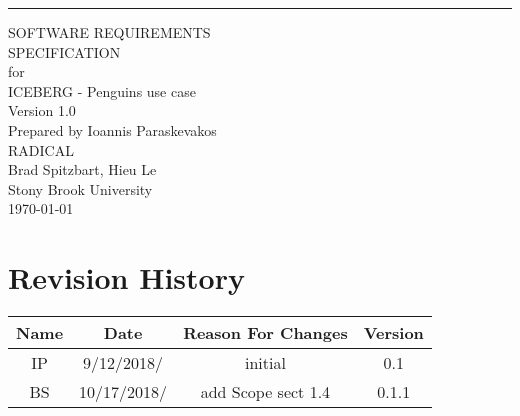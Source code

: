 \documentclass{scrreprt}
\date{}
\title{}
\def\myversion{1.0 }
\begin{document}
\begin{flushright}
    \rule{16cm}{5pt}\vskip1cm
    \begin{bfseries}
    	 \Huge{SOFTWARE REQUIREMENTS\\ SPECIFICATION}\\
    	\vspace{1.9cm}
    	for\\
    	\vspace{1.9cm}
    	ICEBERG - Penguins use case\\
    	\vspace{1.9cm}
    	\LARGE{Version \myversion}\\
    	\vspace{1.9cm}
    	Prepared by Ioannis Paraskevakos\\
    	RADICAL\\
    	Brad Spitzbart, Hieu Le\\
    	Stony Brook University\\
    	\vspace{1.9cm}
    	\today\\
    \end{bfseries}
\end{flushright}

\tableofcontents


\chapter*{Revision History}

\begin{center}
	\begin{tabular}{|c|c|c|c|}
		\hline
		Name & Date & Reason For Changes & Version\\\hline
		IP & 9/12/2018/ & initial & 0.1\\\hline
		BS & 10/17/2018/ & add Scope sect 1.4 & 0.1.1\\\hline
	\end{tabular}
\end{center}


\end{document}
